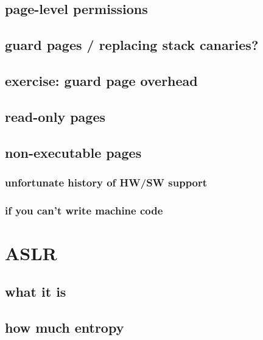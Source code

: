\subsection{page-level permissions}


\subsection{guard pages / replacing stack canaries?}


\subsection{exercise: guard page overhead}


\subsection{read-only pages}


\subsection{non-executable pages}


\subsubsection{unfortunate history of HW/SW support}


\subsubsection{if you can't write machine code}


\section{ASLR}
\subsection{what it is}


\subsection{how much entropy}


